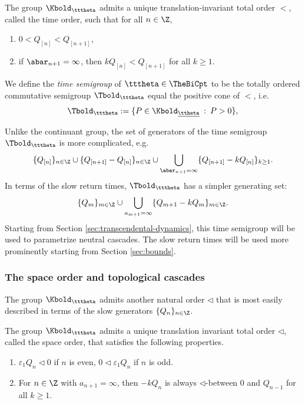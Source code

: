 \documentclass{amsart}
\begin{document}
\begin{proposition}
\label{prop:time-order}
    The group $\Kbold_{\tttheta}$ admits a unique translation-invariant total order $<$, called the time order, such that for all $n \in \Z$,
    \begin{enumerate}
        \item $0 < Q_{[n]} < Q_{[n+1]}$,
        \item if $\abar_{n+1} = \infty$, then $k Q_{[n]} < Q_{[n+1]}$ for all $k \geq 1$.
    \end{enumerate}
\end{proposition}

\begin{definition}
    We define the \emph{time semigroup} of $\tttheta \in \TheBiCpt$ to be the totally ordered commutative semigroup $\Tbold_{\tttheta}$ equal the positive cone of $<$, i.e.
\[
    \Tbold_{\tttheta} := \{P \in \Kbold_{\underline{\ttheta}} \: : \: P > 0 \},
\] 
\end{definition}

Unlike the continuant group, the set of generators of the time semigroup $\Tbold_{\tttheta}$ is more complicated, e.g.
\begin{align*}
    \{ Q_{[n]}\}_{n \in \Z} \cup 
    \{Q_{[n+1]}-Q_{[n]}\}_{n\in\Z}
    \cup 
    \bigcup_{\abar_{n+1} = \infty} \{Q_{[n+1]}- k Q_{[n]}\}_{k \geq 1}.
\end{align*}
In terms of the slow return times, $\Tbold_{\tttheta}$ has a simpler generating set:
    \[
        \{Q_m\}_{m \in \Z} \cup \bigcup_{a_{m+1} = \infty} \{ Q_{m+1} - k Q_m \}_{m \in \Z}.
    \]
Starting from Section \ref{sec:transcendental-dynamics}, this time semigroup will be used to parametrize neutral cascades.
The slow return times will be used more prominently starting from Section \ref{sec:bounds}.

\subsubsection{The space order and topological cascades}

The group $\Kbold_{\tttheta}$ admits another natural order $\lhd$ that is most easily described in terms of the slow generators $\{Q_n\}_{n \in \Z}$.

\begin{proposition}
\label{prop:space-order}
    The group $\Kbold_{\tttheta}$ admits a unique translation invariant total order $\lhd$, called the space order, that satisfies the following properties.
    \begin{enumerate}
        \item $\varepsilon_1 Q_n \lhd 0$ if $n$ is even, $0 \lhd \varepsilon_1 Q_n$ if $n$ is odd.
        \item For $n \in \Z$ with $a_{n+1} = \infty$, then $-kQ_n$ is always $\lhd$-between $0$ and $Q_{n-1}$ for all $k \geq 1$.
    \end{enumerate}
\end{proposition}
\end{document}
